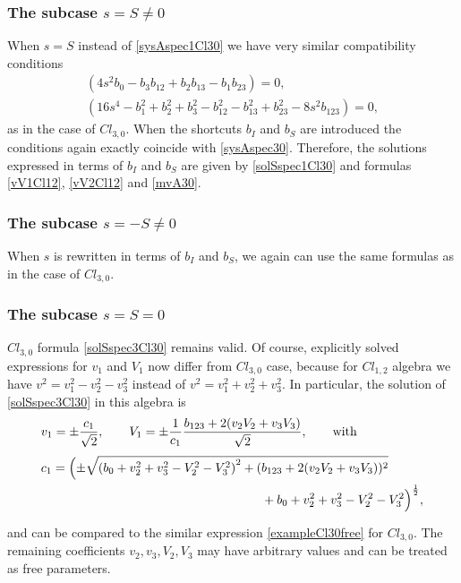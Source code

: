 \documentclass{birkjour}
\newcommand{\cl}[2]{\ensuremath{\mathit{Cl}_{#1,#2}}}
\begin{document}
\subsubsection{The subcase $s=S\neq 0$}
When $s=S$ instead of \eqref{sysAspec1Cl30} we have very similar
compatibility conditions
\begin{equation}\begin{split}\label{sysAspec1Cl12}
  (4 s^2 b_0-b_3 b_{12}+b_2 b_{13}-b_1 b_{23})=0,\\
  (16 s^4-b_1^2+b_2^2+b_3^2-b_{12}^2-b_{13}^2+b_{23}^2-8 s^2 b_{123})=0,
 \end{split}\end{equation}
as in the case of \cl{3}{0}. When the shortcuts $b_I$ and $b_S$
are introduced the conditions again exactly coincide with
\eqref{sysAspec30}. Therefore, the solutions expressed in terms of
$b_I$ and $b_S$ are given by \eqref{solSspec1Cl30} and formulas
\eqref{vV1Cl12}, \eqref{vV2Cl12} and \eqref{mvA30}.

\subsubsection{The subcase $s=-S\neq 0$}
When $s$ is rewritten in terms of $b_I$ and $b_S$, we again can
use the same formulas as in the case of \cl{3}{0}.

\subsubsection{The subcase $s=S= 0$}
\cl{3}{0} formula \eqref{solSspec3Cl30} remains valid. Of course,
explicitly solved expressions for $v_1$ and $V_1$ now differ from
\cl{3}{0} case, because for \cl{1}{2} algebra we have  $v^2=v_1^2
- v_2^2 - v_3^2$ instead of $v^2=v_1^2 + v_2^2 + v_3^2$. In
particular,  the solution of \eqref{solSspec3Cl30} in this algebra
is
\begin{equation}
\begin{split}
&v_{1}=\pm \frac{c_1}{\sqrt{2}},\qquad
  V_{1}=\pm \frac{1}{c_1} \frac{b_{123}+2 (v_{2} V_{2}+v_{3} V_{3})}{\sqrt{2}},\qquad \textrm{with}\quad \\[3pt]
&c_1=\Bigl(\pm\sqrt{\left(b_{0}+v_{2}^2+v_{3}^2-V_{2}^2-V_{3}^2\right)^2+
   (b_{123}+2 (v_{2} V_{2}+v_{3} V_{3}))^2}\\
&\phantom{\frac{1}{\sqrt{2}}b_{0}-v_{2}^2-v_{3}^2  \big(b_{123}-2
(v_{2} V_{2}+v_{3} V_{3})\big)x}
 +b_{0}+v_{2}^2+v_{3}^2-V_{2}^2-V_{3}^2\Bigr)^{\frac{1}{2}},
\end{split}
\end{equation}
and can be compared to the similar expression
\eqref{exampleCl30free} for \cl{3}{0}. The remaining coefficients
$v_2,v_3,V_2,V_3$  may have arbitrary values and can be
treated as free parameters.
\end{document}
